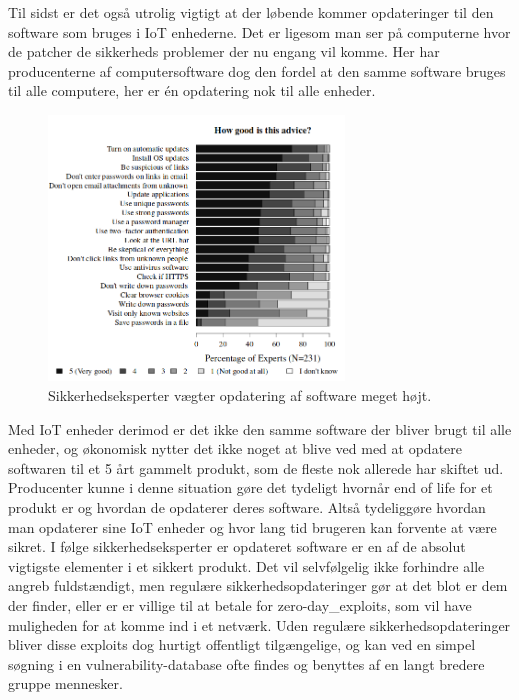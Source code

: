     Til sidst er det også utrolig vigtigt at der løbende kommer opdateringer til den software som bruges i IoT enhederne. Det er ligesom man ser på computerne hvor de patcher de sikkerheds problemer der nu engang vil komme. Her har producenterne af computersoftware dog den fordel at den samme software bruges til alle computere, her er én opdatering nok til alle enheder. \\
    \begin{figure}[H]
        \centering
            \includegraphics[width=0.7\textwidth]{figures/importance_of_updates.png}
        \caption{Sikkerhedseksperter vægter opdatering af software meget højt.\autocite{soups2015}}\label{fig:updates}
    \end{figure}
    Med IoT enheder derimod er det ikke den samme software der bliver brugt til alle enheder, og økonomisk nytter det ikke noget at blive ved med at opdatere softwaren til et 5 årt gammelt produkt, som de fleste nok allerede har skiftet ud.
    Producenter kunne i denne situation gøre det tydeligt hvornår end of life for et produkt er og hvordan de opdaterer deres software. Altså tydeliggøre hvordan man opdaterer sine IoT enheder og hvor lang tid brugeren kan forvente at være sikret. I følge sikkerhedseksperter er opdateret software er en af de absolut vigtigste elementer i et sikkert produkt. \autocite{soups2015}
    Det vil selvfølgelig ikke forhindre alle angreb fuldstændigt, men regulære sikkerhedsopdateringer gør at det blot er dem der finder, eller er er villige til at betale for \glspl{zero-day_exploit}, som vil have muligheden for at komme ind i et netværk. Uden regulære sikkerhedsopdateringer bliver disse exploits dog hurtigt offentligt tilgængelige, og kan ved en simpel søgning i en \gls{vulnerability-database} ofte findes og benyttes af en langt bredere gruppe mennesker.  
    
